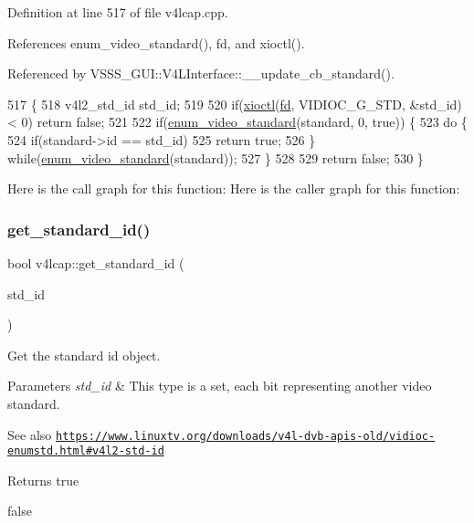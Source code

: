 Definition at line 517 of file v4lcap.\+cpp.



References enum\+\_\+video\+\_\+standard(), fd, and xioctl().



Referenced by V\+S\+S\+S\+\_\+\+G\+U\+I\+::\+V4\+L\+Interface\+::\+\_\+\+\_\+update\+\_\+cb\+\_\+standard().


\begin{DoxyCode}
517                                                          \{
518     v4l2\_std\_id std\_id;
519 
520     \textcolor{keywordflow}{if}(\hyperlink{classv4lcap_ab5aaa5a8c0df17f5ca57e0b5170232cb}{xioctl}(\hyperlink{classv4lcap_a38109593bde997dad13b3a461569573d}{fd}, VIDIOC\_G\_STD, &std\_id) < 0) \textcolor{keywordflow}{return} \textcolor{keyword}{false};
521 
522     \textcolor{keywordflow}{if}(\hyperlink{classv4lcap_a236476c3f736c1870a63ed79f4c1d5a9}{enum\_video\_standard}(standard, 0, \textcolor{keyword}{true})) \{
523         \textcolor{keywordflow}{do} \{
524             \textcolor{keywordflow}{if}(standard->id == std\_id)
525                 \textcolor{keywordflow}{return} \textcolor{keyword}{true};
526         \} \textcolor{keywordflow}{while}(\hyperlink{classv4lcap_a236476c3f736c1870a63ed79f4c1d5a9}{enum\_video\_standard}(standard));
527     \}
528 
529     \textcolor{keywordflow}{return} \textcolor{keyword}{false};
530 \}
\end{DoxyCode}
Here is the call graph for this function\+:
Here is the caller graph for this function\+:
\mbox{\label{classv4lcap_a3db79824d21927b3057c87d19e873498}} 
\subsubsection{\texorpdfstring{get\+\_\+standard\+\_\+id()}{get\_standard\_id()}}
{\footnotesize\ttfamily bool v4lcap\+::get\+\_\+standard\+\_\+id (\begin{DoxyParamCaption}\item[{v4l2\+\_\+std\+\_\+id $\ast$}]{std\+\_\+id }\end{DoxyParamCaption})}



Get the standard id object. 


\begin{DoxyParams}{Parameters}
{\em std\+\_\+id} & This type is a set, each bit representing another video standard. \\
\hline
\end{DoxyParams}
\begin{DoxySeeAlso}{See also}
\href{https://www.linuxtv.org/downloads/v4l-dvb-apis-old/vidioc-enumstd.html#v4l2-std-id}{\tt https\+://www.\+linuxtv.\+org/downloads/v4l-\/dvb-\/apis-\/old/vidioc-\/enumstd.\+html\#v4l2-\/std-\/id} 
\end{DoxySeeAlso}
\begin{DoxyReturn}{Returns}
true 

false 
\end{DoxyReturn}


